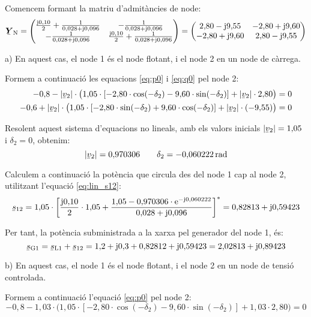 \begin{exemple}
Comencem formant la matriu d'admit\`{a}ncies de node:
\[
\mcmplx{Y}\ped{N} = \begin{pmatrix}
  \frac{\ju 0{,}10}{2} + \frac{1}{0{,}028+\ju0{,}096} & -\frac{1}{0{,}028+\ju0{,}096} \\
  -\frac{1}{0{,}028+\ju0{,}096} & \frac{\ju 0{,}10}{2} + \frac{1}{0{,}028+\ju0{,}096} \\
\end{pmatrix} =
\begin{pmatrix}
  2{,}80 -\ju9{,}55 & -2{,}80 +\ju9{,}60 \\
  -2{,}80 +\ju9{,}60 & 2{,}80 -\ju9{,}55 \\
\end{pmatrix}
\]

a) En aquest cas, el node 1 \'{e}s el node flotant, i el node 2 en un node de c\`{a}rrega.

Formem a continuaci\'{o} les equacions \eqref{eq:p0} i \eqref{eq:q0} pel node 2:
\begin{align*}
-0{,}8 - |\cmplx{v}_2| \cdot \bigl( 1{,}05\cdot [-2{,}80\cdot \cos(-\delta_2) - 9{,}60 \cdot
\sin( -\delta_2)]  + |\cmplx{v}_2| \cdot 2{,}80 \bigr) &= 0 \\
-0{,}6 + |\cmplx{v}_2| \cdot\bigl( 1{,}05 \cdot[-2{,}80\cdot\sin(-\delta_2) +
9{,}60\cdot\cos( -\delta_2)]  + |\cmplx{v}_2|\cdot (-9{,}55) \bigr) &= 0
\end{align*}

Resolent aquest sistema d'equacions no lineals, amb els valors inicials $|\cmplx{v}_2|=1{,}05$ i $\delta_2=0$, obtenim:
\[ |\cmplx{v}_2|=0{,}970306 \qquad \delta_2=-0{,}060222\unit{rad} \]

Calculem a continuaci\'{o} la pot\`{e}ncia que circula des del node 1 cap al node 2, utilitzant l'equaci\'{o} \eqref{eq:lin_s12}:
\[
\cmplx{s}_{12} = 1{,}05\cdot \left[ \frac{\ju0{,}10}{2} \cdot1{,}05 + \frac{ 1{,}05 -
0{,}970306\cdot\eu^{-\ju0{,}060222}} {0{,}028+\ju0{,}096} \right]^* = 0{,}82813 + \ju
0{,}59423
\]

Per tant, la pot\`{e}ncia subministrada a la xarxa pel generador del node 1, \'{e}s:
\[ \cmplx{s}\ped{G1} = \cmplx{s}\ped{L1} + \cmplx{s}_{12} = 1{,}2+\ju0{,}3 + 0{,}82812 + \ju 0{,}59423 = 2{,}02813 + \ju 0{,}89423 \]

b) En aquest cas, el node 1 \'{e}s el node flotant, i el node 2 en un node de tensi\'{o} controlada.

Formem a continuaci\'{o} l'equaci\'{o} \eqref{eq:p0} pel node 2:
\[
-0{,}8 - 1{,}03\cdot \bigl( 1{,}05\cdot [-2{,}80\cdot\cos(-\delta_2) - 9{,}60\cdot\sin(
-\delta_2)] + 1{,}03\cdot 2{,}80 \bigr) = 0
\]


\end{exemple}
